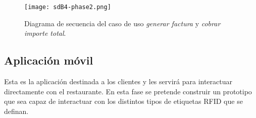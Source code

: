 \begin{itemize}
  \begin{figure}[!h]
    \begin{center}
      \texttt{[image: sdB4-phase2.png]}
      \caption{Diagrama de secuencia del caso de uso \emph{generar factura}
      y \emph{cobrar importe total}.}
      \label{fig:sdB4-phase2}
    \end{center}
  \end{figure}
\end{itemize}


\subsection{Aplicación móvil}
Esta es la aplicación destinada a los clientes y les servirá para interactuar
directamente con el restaurante. En esta fase se pretende construir un
prototipo que sea capaz de interactuar con los distintos
tipos de etiquetas \acs{RFID} que se definan.

